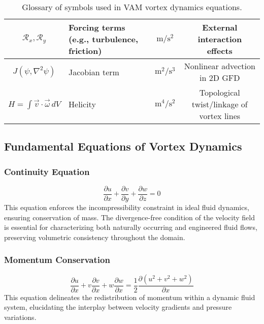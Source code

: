 \documentclass[12pt]{article}
\begin{document}
\begin{table}[H]
\begin{tabular}{|c|l|c|c|}
            $\mathcal{R}_x, \mathcal{R}_y$ & Forcing terms (e.g., turbulence, friction) & $\mathrm{m/s^2}$ & External interaction effects \\
            \hline
            $J(\psi, \nabla^2\psi)$ & Jacobian term & $\mathrm{m^2/s^3}$ & Nonlinear advection in 2D GFD \\
            \hline
            $H = \int \vec{v} \cdot \vec{\omega} \, dV$ & Helicity & $\mathrm{m^4/s^2}$ & Topological twist/linkage of vortex lines \\
            \hline
        \end{tabular}
        \caption{Glossary of symbols used in VAM vortex dynamics equations.}
        \label{tab:vam_vorticity_symbols}
    \end{table}


    \subsection*{Fundamental Equations of Vortex Dynamics}

    \subsubsection*{Continuity Equation}
    \begin{equation*}
        \frac{\partial u}{\partial x} + \frac{\partial v}{\partial y} + \frac{\partial w}{\partial z} = 0
    \end{equation*}
    This equation enforces the incompressibility constraint in ideal fluid dynamics, ensuring conservation of mass. The divergence-free condition of the velocity field is essential for characterizing both naturally occurring and engineered fluid flows, preserving volumetric consistency throughout the domain.

    \subsubsection*{Momentum Conservation}
    \begin{equation*}
        \frac{\partial u}{\partial x} + v \frac{\partial v}{\partial x} + w \frac{\partial w}{\partial x} = \frac{1}{2} \frac{\partial (u^2 + v^2 + w^2)}{\partial x}
    \end{equation*}
    This equation delineates the redistribution of momentum within a dynamic fluid system, elucidating the interplay between velocity gradients and pressure variations.
\end{document}
